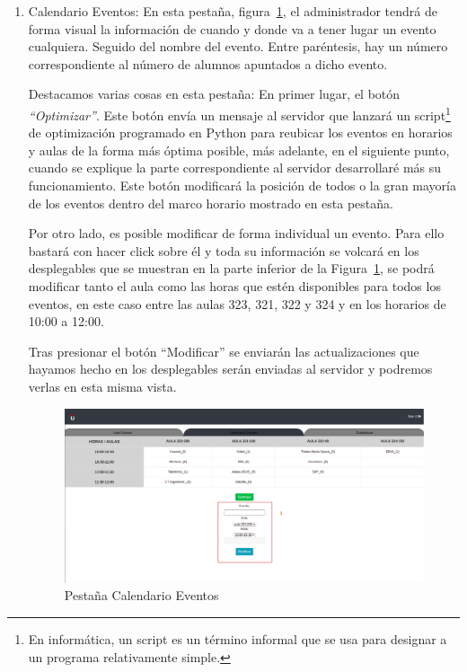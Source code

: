 \documentclass[a4paper, 12pt]{book}
\begin{document}
\begin{enumerate}
	\item Calendario Eventos: En esta pestaña, figura~\ref{fig:adminCalendario}, el administrador tendrá de forma visual la información de cuando y donde va a tener lugar un evento cualquiera. Seguido del nombre del evento. Entre paréntesis, hay un número correspondiente al número de alumnos apuntados a dicho evento.
	
	Destacamos varias cosas en esta pestaña: En primer lugar, el botón \textit{``Optimizar''}. Este botón envía un mensaje al servidor que lanzará un script\footnote{En informática, un script es un término informal que se usa para designar a un programa relativamente simple.} de optimización programado en Python para reubicar los eventos en horarios y aulas de la forma más óptima posible, más adelante, en el siguiente punto, cuando se explique la parte correspondiente al servidor desarrollaré más su funcionamiento. Este botón modificará la posición de todos o la gran mayoría de los eventos dentro del marco horario mostrado en esta pestaña.
	
	Por otro lado, es posible modificar de forma individual un evento. Para ello bastará con hacer click sobre él y toda su información se volcará en los desplegables que se muestran en la parte inferior de la Figura~\ref{fig:adminCalendario}, se podrá modificar tanto el aula como las horas que estén disponibles para todos los eventos, en este caso entre las aulas 323, 321, 322 y 324 y en los horarios de 10:00 a 12:00. 
	
	Tras presionar el botón ``Modificar'' se enviarán las actualizaciones que hayamos hecho en los desplegables serán enviadas al servidor y podremos verlas en esta misma vista.
	
	\begin{figure}[h!]
  	\centering
  	\includegraphics[width=16cm, keepaspectratio]{img/adminCalendario.png}
  	\caption{Pestaña Calendario Eventos}\label{fig:adminCalendario}
	\end{figure}
	


\end{enumerate}
\end{document}
